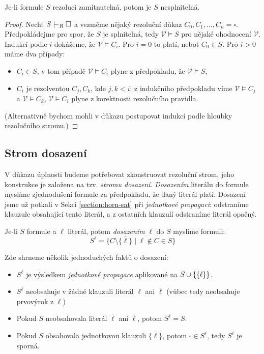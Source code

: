 \begin{theorem}\label{theorem:soundness-resolution}
    
Je-li formule $S$ rezolucí zamítnutelná, potom je $S$ nesplnitelná.
\end{theorem}
\begin{proof}
    Nechť $S\proves_R\square$ a vezměme nějaký rezoluční důkaz $C_0,C_1,\dots,C_n=\square$. Předpokládejme pro spor, že $S$ je splnitelná, tedy $\mathcal V\models S$ pro nějaké ohodnocení $\mathcal V$. Indukcí podle $i$ dokážeme, že $\mathcal V\models C_i$. Pro $i=0$ to platí, neboť $C_0\in S$. Pro $i>0$ máme dva případy:
    \begin{itemize}
        \item $C_i\in S$, v tom případě $\mathcal V\models C_i$ plyne z předpokladu, že $\mathcal V\models S$,
        \item $C_i$ je rezolventou $C_j,C_k$, kde $j,k<i$: z indukčního předpokladu víme $\mathcal V\models C_j$ a $\mathcal V\models C_k$, $\mathcal V\models C_i$ plyne z korektnosti rezolučního pravidla.
    \end{itemize}
    (Alternativně bychom mohli v důkazu postupovat indukcí podle hloubky rezolučního stromu.)
\end{proof}


\subsection{Strom dosazení}

V důkazu úplnosti budeme potřebovat zkonstruovat rezoluční strom, jeho konstrukce je založena na tzv. \emph{stromu dosazení}. \emph{Dosazením} literálu do formule myslíme zjednodušení formule za předpokladu, že daný literál platí. Dosazení jsme už potkali v Sekci \ref{section:horn-sat} při \emph{jednotkové propagaci}: odstraníme klauzule obsahující tento literál, a z ostatních klauzulí odstraníme literál opačný.

\begin{definition}
    Je-li $S$ formule a $\ell$ literál, potom \emph{dosazením} $\ell$ do $S$ myslíme formuli:
    $$
        S^\ell=\{C\setminus\{\bar\ell\}\mid \ell\notin C\in S\}
    $$    
\end{definition}

\begin{observation} Zde shrneme několik jednoduchých faktů o dosazení:
\begin{itemize}
    \item $S^\ell$ je výsledkem \emph{jednotkové propagace} aplikované na $S\mathbin{\cup}\{\{\ell\}\}$.
    \item $S^\ell$ neobsahuje v žádné klauzuli literál $\ell$ ani $\bar\ell$ (vůbec tedy neobsahuje prvovýrok z $\ell$)
    \item Pokud $S$ neobsahovala literál $\ell$ ani $\bar\ell$, potom $S^\ell=S$.
    \item Pokud $S$ obsahovala jednotkovou klauzuli $\{\bar\ell\}$, potom $\square\in S^\ell$, tedy $S^\ell$ je sporná.
\end{itemize}    
\end{observation}

